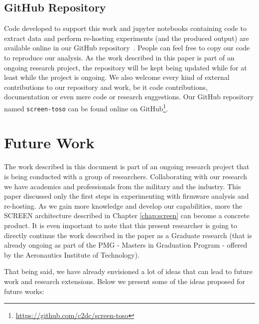 \subsection{GitHub Repository}
Code developed to support this work and jupyter notebooks containing code to extract data and perform re-hosting experiments (and the produced output) are available online in our GitHub repository~\cite{github:c2dc-toso}. People can feel free to copy our code to reproduce our analysis. As the work described in this paper is part of an ongoing research project, the repository will be kept being updated while for at least while the project is ongoing. We also welcome every kind of external contributions to our repository and work, be it code contributions, documentation or even mere code or research suggestions. Our GitHub repository named {\tt screen-toso} can be found online on GitHub\footnote{\url{https://github.com/c2dc/screen-toso}}.

\section{Future Work}
\label{sec:future-work}

The work described in this document is part of an ongoing research project that is being conducted with a group of researchers. Collaborating with our research we have academics and professionals from the military and the industry. This paper discussed only the first steps in experimenting with firmware analysis and re-hosting. As we gain more knowledge and develop our capabilities, more the SCREEN architecture described in Chapter \ref{chap:screen} can become a concrete product. It is even important to note that this present researcher is going to directly continue the work described in the paper as a Graduate research (that is already ongoing as part of the PMG - Masters in Graduation Program - offered by the Aeronautics Institute of Technology).

That being said, we have already envisioned a lot of ideas that can lead to future work and research extensions. Below we present some of the ideas proposed for future works:

